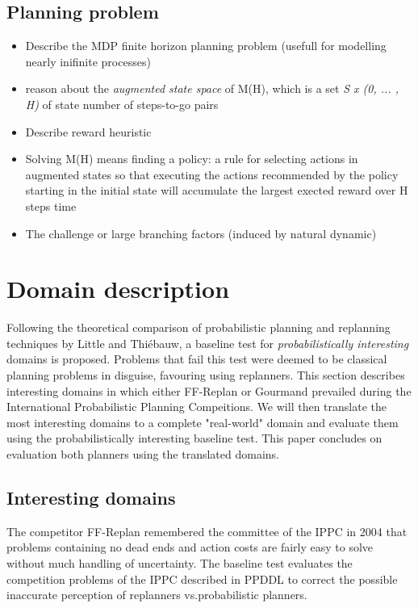 \documentclass[runningheads,a4paper]{llncs}
\begin{document}
\subsection{Planning problem}
\begin{itemize}
	\item Describe the MDP finite horizon planning problem (usefull for modelling nearly inifinite processes)
	\item reason about the \emph{augmented state space} of M(H), which is a set \emph{S x (0, ... , H)} of state number of steps-to-go pairs
	\item Describe reward heuristic
	\item Solving M(H) means finding a policy: a rule for selecting actions in augmented states so that executing the actions recommended by the policy starting in the initial state will accumulate the largest exected reward over H steps time
	\item The challenge or large branching factors (induced by natural dynamic)
\end{itemize}



\section{Domain description}
Following the theoretical comparison of probabilistic planning and replanning techniques by Little and Thi\'ebauw, a baseline test for \emph{probabilistically interesting} domains is proposed. Problems that fail this test were deemed to be classical planning problems in disguise, favouring using replanners\cite{little2007probvsreplan}. This section describes interesting domains in which either FF-Replan or Gourmand prevailed during the International Probabilistic Planning Compeitions. We will then translate the most interesting domains to a complete "real-world" domain and evaluate them using the probabilistically interesting baseline test. This paper concludes on evaluation both planners using the translated domains.

\subsection{Interesting domains}
The competitor FF-Replan\cite{FFReplan} remembered the committee of the IPPC in 2004 that problems containing no dead ends and action costs are fairly easy to solve without much handling of uncertainty. The baseline test evaluates the competition problems of the IPPC described in PPDDL to correct the possible inaccurate perception of replanners vs.\@ probabilistic planners.
\end{document}
